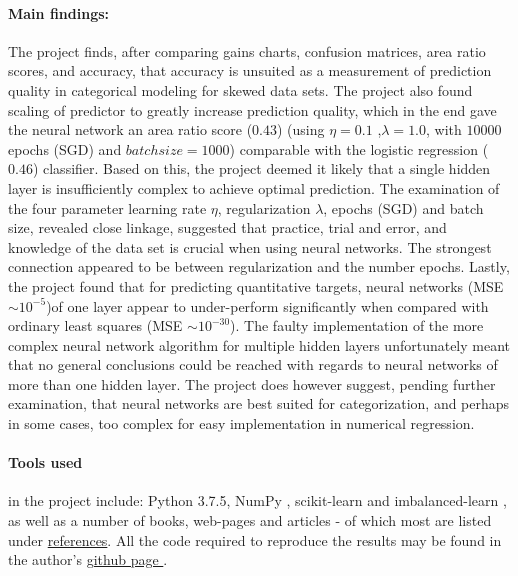 \documentclass[%
oneside,                 %
final,                   %
10pt]{article}
\begin{document}
\paragraph{Main findings:} The project finds, after comparing gains charts, confusion matrices, area ratio scores, and accuracy, that accuracy is unsuited as a measurement of prediction quality in categorical modeling for skewed data sets. The project also found scaling of predictor to greatly increase prediction quality, which in the end gave the neural network an area ratio score ($0.43$) (using $\eta=0.1$ ,$\lambda=1.0$, with $10000$ epochs (SGD) and $batch size=1000$) comparable with the logistic regression ($0.46$) classifier. Based on this, the project deemed it likely that a single hidden layer is insufficiently complex to achieve optimal prediction. The examination of the four parameter  learning rate $\eta$, regularization $\lambda$, epochs (SGD) and batch size, revealed close linkage, suggested that practice, trial and error, and knowledge of the data set is crucial when using neural networks. The strongest connection appeared to be between regularization and the number epochs.  Lastly, the project found that for predicting quantitative targets, neural networks (MSE $\sim   10^{-5} $)of one layer appear to under-perform significantly when compared with ordinary least squares (MSE $ \sim  10^{-30} $). The faulty implementation of the more complex neural network algorithm for multiple hidden layers unfortunately meant that no general conclusions could be reached with regards to neural networks of more than one hidden layer. The project does however suggest, pending further examination, that neural networks are best suited for categorization, and perhaps in some cases, too complex for easy implementation in numerical regression. 

\paragraph{Tools used}in the project include: Python 3.7.5, NumPy \cite{numpy}, scikit-learn \cite{sklearn} and imbalanced-learn \cite{imblearn}, as well as a number of books, web-pages and articles - of which most are listed under  \hyperref[refer]{references}. All the code required to reproduce the results may be found in the author's \href{https://github.com/johanere/FYS-STK4155/tree/master/Project2}{github page }.
\newline
\end{document}
